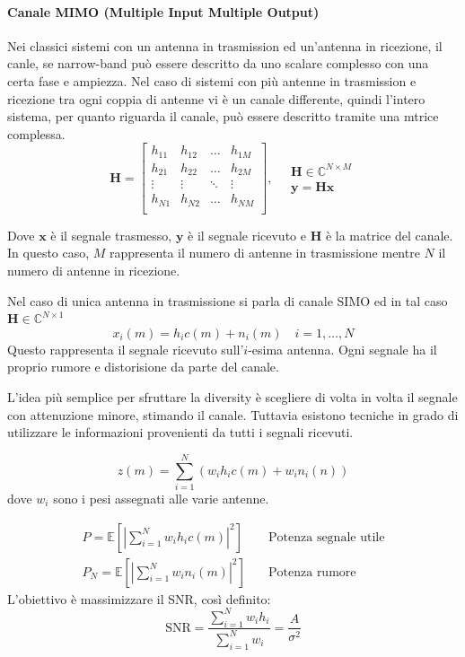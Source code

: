 \paragraph*{Canale MIMO (Multiple Input Multiple Output)}


Nei classici sistemi con un antenna in trasmission ed un'antenna in ricezione, il canle, se narrow-band può essere descritto da uno scalare complesso con una certa fase e ampiezza.
Nel caso di sistemi con più antenne in trasmission e ricezione tra ogni coppia di antenne vi è un canale differente, quindi l'intero sistema, per quanto riguarda il canale, può essere descritto tramite una mtrice complessa.
\[ 
    \mathbf{H} = 
    \begin{bmatrix}
        h_{11} & h_{12} & \ldots & h_{1M} \\
        h_{21} & h_{22} & \ldots & h_{2M} \\
        \vdots & \vdots & \ddots & \vdots \\
        h_{N1} & h_{N2} & \ldots & h_{NM} \\
    \end{bmatrix}
    , \quad
    \begin{array}{ll}
            \mathbf{H} \in \mathbb{C}^{N \times M} \\
            \mathbf{y} = \mathbf{Hx} 
    \end{array}
\]

Dove $\mathbf{x}$ è il segnale trasmesso, $\mathbf{y}$ è il segnale ricevuto e $\mathbf{H}$ è la matrice del canale. In questo caso, $M$ rappresenta il numero di antenne in trasmissione mentre $N$ il numero di antenne in ricezione.

Nel caso di unica antenna in trasmissione si parla di canale SIMO ed in tal caso $\mathbf{H} \in \mathbb{C}^{N \times 1}$
\[
    x_i(m) = h_i c(m) + n_i(m) \quad i = 1, \ldots, N
\]
Questo rappresenta il segnale ricevuto sull'$i$-esima antenna. Ogni segnale ha il proprio rumore e distorisione da parte del canale.

L'idea più semplice per sfruttare la diversity è scegliere di volta in volta il segnale con attenuzione minore, stimando il canale. Tuttavia esistono tecniche in grado di utilizzare le informazioni provenienti da tutti i segnali ricevuti.

\[
    z(m) = \sum_{i=1}^{N} \left( w_i h_i c(m) + w_i n_i(n) \right)
\]
dove $w_i$ sono i pesi assegnati alle varie antenne.


\[
    \begin{array}{ll} 
        P = \mathbb{E} \left[ \left| \sum_{i=1}^{N} w_i h_i c(m)  \right|^2 \right] \quad & \text{Potenza segnale utile} \\
        P_N = \mathbb{E} \left[ \left| \sum_{i=1}^{N} w_i n_i(m)  \right|^2 \right] \quad & \text{Potenza rumore}
    \end{array}
\]
L'obiettivo è massimizzare il SNR, così definito:
\[
    \text{SNR} = \frac{\sum_{i=1}^{N} w_i h_i}{\sum_{i=1}^{N} w_i} = \frac{A}{\sigma^2}  
\]

